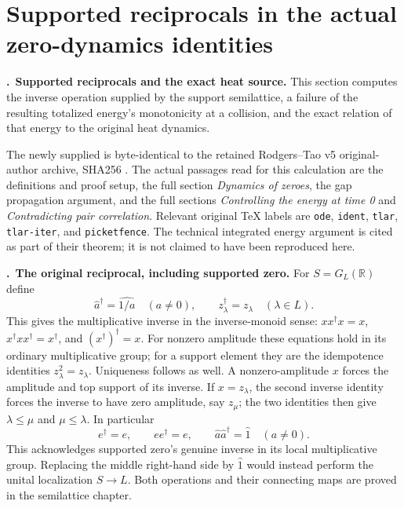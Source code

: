\documentclass[11pt,a4paper]{article}
\theoremstyle{definition}\newtheorem{definition}[theorem]{Definition}
\begin{document}
\section{Supported reciprocals in the actual zero-dynamics identities}
\label{sec:rd}
\newcommand{\RD}{\par\medskip\noindent\textbf{\therd.}\ }

\RD\textbf{Supported reciprocals and the exact heat source.}
This section computes the inverse operation supplied by the support
semilattice, a failure of the resulting totalized energy's monotonicity
at a collision, and the exact relation of that energy to the original
heat dynamics.

The newly supplied  is byte-identical
to the retained Rodgers--Tao v5 original-author archive, SHA256
.
The actual passages read for this calculation are the definitions and
proof setup, the full section \emph{Dynamics of zeroes}, the gap
propagation argument, and the full sections \emph{Controlling the energy
at time 0} and \emph{Contradicting pair correlation}. Relevant original
TeX labels are \texttt{ode}, \texttt{ident}, \texttt{tlar},
\texttt{tlar-iter}, and \texttt{picketfence}. The technical integrated
energy argument is cited as part of their theorem; it is not claimed
to have been reproduced here.

\RD\textbf{The original reciprocal, including supported zero.}
For $S=G_L(\mathbb R)$ define
\[
 \widehat a^{\dagger}=\widehat{1/a}\quad(a\ne0),
 \qquad z_\lambda^{\dagger}=z_\lambda\quad(\lambda\in L).
\]
This gives the multiplicative inverse in the inverse-monoid sense:
$xx^\dagger x=x$, $x^\dagger xx^\dagger=x^\dagger$, and
$(x^\dagger)^\dagger=x$. For nonzero amplitude these equations hold
in its ordinary multiplicative group; for a support element they are
the idempotence identities $z_\lambda^2=z_\lambda$. Uniqueness follows
as well. A nonzero-amplitude $x$ forces the amplitude and top support
of its inverse. If $x=z_\lambda$, the second inverse identity forces
the inverse to have zero amplitude, say $z_\mu$; the two identities
then give $\lambda\le\mu$ and $\mu\le\lambda$.
In particular
\[
 e^\dagger=e,\qquad ee^\dagger=e,\qquad
 \widehat a\widehat a^\dagger=\widehat1\quad(a\ne0).
\]
This acknowledges supported zero's genuine inverse in its local
multiplicative group. Replacing the middle right-hand side by
$\widehat1$ would instead perform the unital localization $S\to L$.
Both operations and their connecting maps are proved in the
semilattice chapter.
\end{document}
